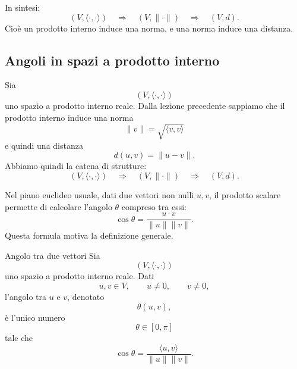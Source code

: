 \documentclass[a4paper]{article}
\begin{document}
In sintesi:
\[
    (V,\langle\cdot,\cdot\rangle)
    \quad\Longrightarrow\quad
    (V,\|\cdot\|)
    \quad\Longrightarrow\quad
    (V,d).
\]
Cioè un prodotto interno induce una norma, e una norma induce una distanza.

\subsection{Angoli in spazi a prodotto interno}

Sia
\[
    (V,\langle\cdot,\cdot\rangle)
\]
uno spazio a prodotto interno reale. Dalla lezione precedente sappiamo che il prodotto interno induce una norma
\[
    \|v\|=\sqrt{\langle v,v\rangle}
\]
e quindi una distanza
\[
    d(u,v)=\|u-v\|.
\]
Abbiamo quindi la catena di strutture:
\[
    (V,\langle\cdot,\cdot\rangle)
    \quad\Longrightarrow\quad
    (V,\|\cdot\|)
    \quad\Longrightarrow\quad
    (V,d).
\]

Nel piano euclideo usuale, dati due vettori non nulli \(u,v\), il prodotto scalare permette di calcolare l'angolo \(\theta\) compreso tra essi:
\[
    \cos\theta
    =
    \frac{u\cdot v}{\|u\|\|v\|}.
\]
Questa formula motiva la definizione generale.

\begin{center}
\end{center}

\begin{snippetdefinition}{Angolo tra due vettori}
    Sia
    \[
        (V,\langle\cdot,\cdot\rangle)
    \]
    uno spazio a prodotto interno reale. Dati
    \[
        u,v\in V,
        \qquad
        u\neq 0,
        \qquad
        v\neq 0,
    \]
    l'angolo tra \(u\) e \(v\), denotato
    \[
        \theta(u,v),
    \]
    è l'unico numero
    \[
        \theta\in[0,\pi]
    \]
    tale che
    \[
        \cos\theta
        =
        \frac{\langle u,v\rangle}{\|u\|\|v\|}.
    \]
\end{snippetdefinition}
\end{document}
